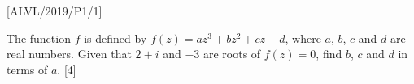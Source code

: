 \item {[}ALVL/2019/P1/1{]}

The function $f$ is defined by $f\left(z\right)=az^{3}+bz^{2}+cz+d$,
where $a$, $b$, $c$ and $d$ are real numbers. Given that $2+i$
and $-3$ are roots of $f\left(z\right)=0$, find $b$, $c$ and $d$
in terms of $a$.\hfill{} {[}4{]}
